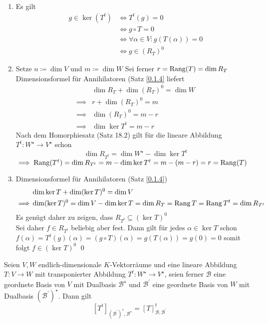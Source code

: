 \begin{subproof*}
	\begin{enumerate}[label=(\arabic*)]
		\item Es gilt
			\begin{align*}
				g \in \ker(T^{t} ) &\iff T^{t} (g) = 0\\
				~&\iff g \circ T = 0 \\
				~&\iff \forall \alpha \in V : g(T(\alpha)) = 0 \\
				~&\iff g \in (R_T)^0
			\end{align*}
		\item Setze $ n \coloneqq  \dim V $ und $ m \coloneqq  \dim W $
			Sei ferner $ r = \operatorname{Rang}(T) = \dim R_T $\\
			Dimensionsformel für Annihilatoren (Satz \ref{0.1.4} liefert
			\begin{align*}
				~& \dim R_T + \dim (R_T)^0 = \dim W \\
				\implies & r + \dim (R_T)^0 = m \\
				\implies & \dim (R_T)^0 = m - r \\
				\implies & \dim \ker T^{t} = m - r
			\end{align*}
			Nach dem Homorphiesatz (Satz 18.2) gilt für die lineare Abbildung $ T^{t} : W^\star  \to V^\star  $ schon
			\[
				\dim R_{T^t} = \dim W^\star  - \dim \ker T^t
			\]
			$ \implies \operatorname{Rang}(T^t) = \dim R_{T^t} = m - \dim \ker T^t = m - (m - r) = r = \operatorname{Rang}(T) $ 
		\item Dimensionsformel für Annihilatoren (Satz \ref{0.1.4})
			\begin{align*}
				~ & \dim \ker T + \dim ( \ker T )^0 = \dim V \\
				\implies & \dim (\ker T )^0 = \dim V - \dim \ker T = \dim R_T = \operatorname{Rang} T = \operatorname{Rang} T^t = \dim R_{T^t} 
			\end{align*}
			Es genügt daher zu zeigen, dass $ R_{T^t} \subseteq ( \ker T )^0 $\\
			Sei daher $ f \in R_{T^t}  $ beliebig aber fest. Dann gilt für jedes $ \alpha \in \ker T $ schon $ f(\alpha) = T^t(g) (\alpha) = ( g \circ T ) (\alpha) = g(T(\alpha)) = g(0) = 0 $ somit folgt $ f \in ( \ker T )^0 $ \qed
	\end{enumerate}
\end{subproof*}

\begin{subtheorem}
	Seien $ V, W $ endlich-dimensionale $ K $-Vektorräume und eine lineare Abbildung $ T: V \to W $ mit transponierter Abbildung $ T^t: W^\star \to V^\star  $, seien ferner $ \mathcal{B}  $ eine geordnete Basis von $ V  $ mit Dualbasis $ \mathcal{B} ^\star  $ und $ \mathcal{B} ^\prime $ eine geordnete Basis von $ W $ mit Dualbasis $ (\mathcal{B} ^\prime)^\star  $. Dann gilt
	\[
		[T^t]_{(\mathcal{B} ^\prime)^\star , \mathcal{B}^\star } = [T]_{\mathcal{B} , \mathcal{B} ^\prime} ^t
	\]
\end{subtheorem}

